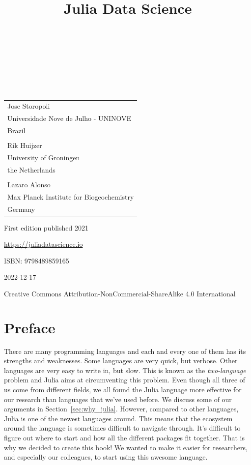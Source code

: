 \documentclass[
  notoc %
]{tufte-book}
\title{Julia Data Science}
\author{\noindent{Jose Storopoli}\\[3mm] \noindent{Rik
Huijzer}\\[3mm] \noindent{Lazaro Alonso}\\[3mm] }
\date{}
\begin{document}
\makeatletter
\thispagestyle{empty}
\vfill
{\Huge\bf
\noindent
\@title
}\\[1in]
{\Large
\noindent
\@author
}
\makeatother

\makeatletter
\newpage
\thispagestyle{empty}
\vfill
{\noindent
\begin{tabular}{l} Jose Storopoli\\ Universidade Nove de Julho - UNINOVE\\ Brazil\\ \\ Rik Huijzer\\ University of Groningen\\ the Netherlands\\ \\ Lazaro Alonso\\ Max Planck Institute for Biogeochemistry\\ Germany \end{tabular}
}
\vfill
{\small
First edition published 2021

\url{https://juliadatascience.io}

ISBN: 9798489859165

2022-12-17

Creative Commons Attribution-NonCommercial-ShareAlike 4.0 International
}
\makeatother


\frontmatter
\mainmatter

\setcounter{tocdepth}{1}
\tableofcontents

\justifying

\setlength{\parindent}{0pt}

\hypertarget{sec:preface}{%
\chapter{Preface}\label{sec:preface}}

There are many programming languages and each and every one of them has
its strengths and weaknesses. Some languages are very quick, but
verbose. Other languages are very easy to write in, but slow. This is
known as the \emph{two-language} problem and Julia aims at circumventing
this problem. Even though all three of us come from different fields, we
all found the Julia language more effective for our research than
languages that we've used before. We discuss some of our arguments in
Section~\ref{sec:why_julia}. However, compared to other languages, Julia
is one of the newest languages around. This means that the ecosystem
around the language is sometimes difficult to navigate through. It's
difficult to figure out where to start and how all the different
packages fit together. That is why we decided to create this book! We
wanted to make it easier for researchers, and especially our colleagues,
to start using this awesome language.
\end{document}
